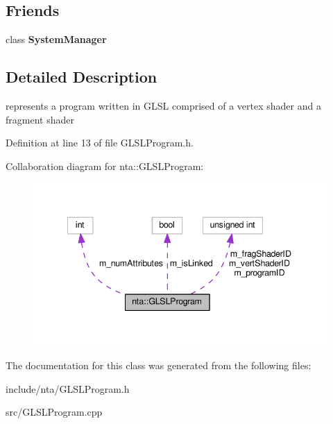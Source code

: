 \subsection*{Friends}
\begin{DoxyCompactItemize}
\item 
\mbox{\label{classnta_1_1GLSLProgram_ab1ef2aa9992dd8ae85793e1a1f980e1e}} 
class {\bfseries System\+Manager}
\end{DoxyCompactItemize}


\subsection{Detailed Description}
represents a program written in G\+L\+SL comprised of a vertex shader and a fragment shader 

Definition at line 13 of file G\+L\+S\+L\+Program.\+h.



Collaboration diagram for nta\+:\+:G\+L\+S\+L\+Program\+:
\nopagebreak
\begin{figure}[H]
\begin{center}
\leavevmode
\includegraphics[width=341pt]{d0/df1/classnta_1_1GLSLProgram__coll__graph}
\end{center}
\end{figure}


The documentation for this class was generated from the following files\+:\begin{DoxyCompactItemize}
\item 
include/nta/G\+L\+S\+L\+Program.\+h\item 
src/G\+L\+S\+L\+Program.\+cpp\end{DoxyCompactItemize}
